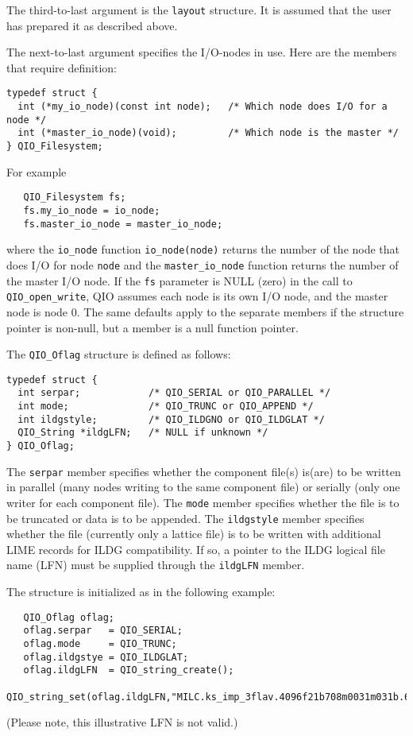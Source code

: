 \documentclass{article}
\begin{document}
The third-to-last argument is the \verb|layout| structure.  It is
assumed that the user has prepared it as described above.

The next-to-last argument specifies the I/O-nodes in use.  Here are
the members that require definition:
%
\begin{verbatim}
typedef struct {
  int (*my_io_node)(const int node);   /* Which node does I/O for a node */
  int (*master_io_node)(void);         /* Which node is the master */
} QIO_Filesystem;
\end{verbatim}
%
For example
%
\begin{verbatim}
   QIO_Filesystem fs;
   fs.my_io_node = io_node;
   fs.master_io_node = master_io_node;
\end{verbatim}
%
where the \verb|io_node| function \verb|io_node(node)| returns the
number of the node that does I/O for node \verb|node| and the
\verb|master_io_node| function returns the number of the master I/O
node.  If the \verb|fs| parameter is NULL (zero) in the call to
\verb|QIO_open_write|, QIO assumes each node is its own I/O node, and
the master node is node 0.  The same defaults apply to the separate
members if the structure pointer is non-null, but a member is a null
function pointer.

The \verb|QIO_Oflag| structure is defined as follows:
%
\begin{verbatim}
typedef struct {
  int serpar;            /* QIO_SERIAL or QIO_PARALLEL */
  int mode;              /* QIO_TRUNC or QIO_APPEND */
  int ildgstyle;         /* QIO_ILDGNO or QIO_ILDGLAT */
  QIO_String *ildgLFN;   /* NULL if unknown */
} QIO_Oflag;
\end{verbatim}
%

The \verb|serpar| member specifies whether the component file(s)
is(are) to be written in parallel (many nodes writing to the same
component file) or serially (only one writer for each component file).
The \verb|mode| member specifies whether the file is to be truncated
or data is to be appended.  The \verb|ildgstyle| member specifies
whether the file (currently only a lattice file) is to be written with
additional LIME records for ILDG compatibility. If so, a pointer to
the ILDG logical file name (LFN) must be supplied through the
\verb|ildgLFN| member.  

The structure is initialized as in the following example:

%
\begin{verbatim}
   QIO_Oflag oflag;
   oflag.serpar   = QIO_SERIAL;
   oflag.mode     = QIO_TRUNC;
   oflag.ildgstye = QIO_ILDGLAT;
   oflag.ildgLFN  = QIO_string_create();
   QIO_string_set(oflag.ildgLFN,"MILC.ks_imp_3flav.4096f21b708m0031m031b.696");
\end{verbatim}
%
(Please note, this illustrative LFN is not valid.)
\end{document}
